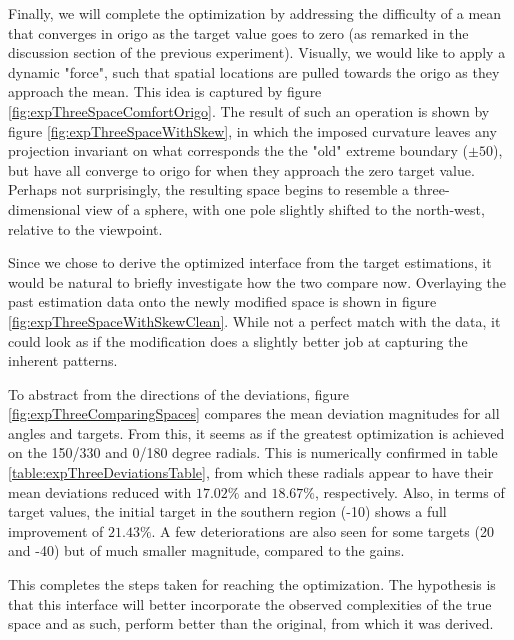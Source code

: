 
Finally, we will complete the optimization by addressing the difficulty of a mean that converges in origo as the target value goes to zero (as remarked in the discussion section of the previous experiment). Visually, we would like to apply a dynamic "force", such that spatial locations are pulled towards the origo as they approach the mean. This idea is captured by figure \ref{fig:expThreeSpaceComfortOrigo}. The result of such an operation is shown by figure \ref{fig:expThreeSpaceWithSkew}, in which the imposed curvature leaves any projection invariant on what corresponds the the "old" extreme boundary ($\pm50$), but have all converge to origo for when they approach the zero target value. Perhaps not surprisingly, the resulting space begins to resemble a three-dimensional view of a sphere, with one pole slightly shifted to the north-west, relative to the viewpoint. 


Since we chose to derive the optimized interface from the target estimations, it would be natural to briefly investigate how the two compare now. Overlaying the past estimation data onto the newly modified space is shown in figure \ref{fig:expThreeSpaceWithSkewClean}. While not a perfect match with the data, it could look as if the modification does a slightly better job at capturing the inherent patterns. 

To abstract from the directions of the deviations, figure \ref{fig:expThreeComparingSpaces} compares the mean deviation magnitudes for all angles and targets. From this, it seems as if the greatest optimization is achieved on the 150/330 and 0/180 degree radials. This is numerically confirmed in table \ref{table:expThreeDeviationsTable}, from which these radials appear to have their mean deviations reduced with $17.02\%$ and $18.67\%$, respectively. Also, in terms of target values, the initial target in the southern region (-10) shows a full improvement of $21.43\%$. A few deteriorations are also seen for some targets (20 and -40) but of much smaller magnitude, compared to the gains.  

This completes the steps taken for reaching the optimization. The hypothesis is that this interface will better incorporate the observed complexities of the true space and as such, perform better than the original, from which it was derived.


